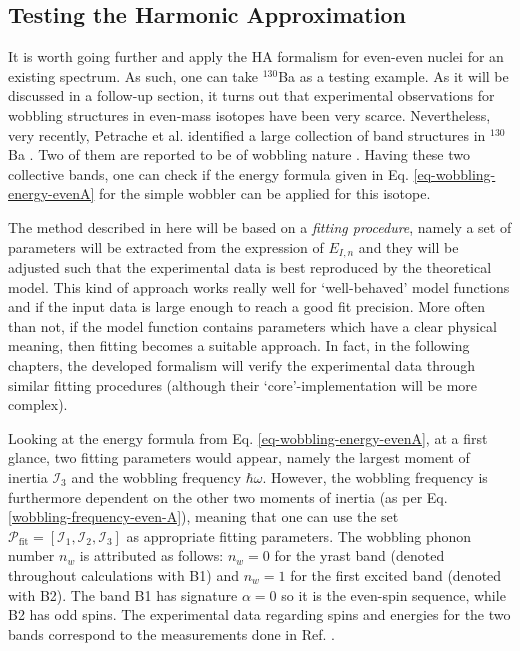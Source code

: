 \subsection{Testing the Harmonic Approximation}

It is worth going further and apply the HA formalism for even-even nuclei for an existing spectrum. As such, one can take $^{130}$Ba as a testing example. As it will be discussed in a follow-up section, it turns out that experimental observations for wobbling structures in even-mass isotopes have been very scarce. Nevertheless, very recently, Petrache et al. identified a large collection of band structures in $^{130}$Ba \cite{petrache2019diversity}. Two of them are reported to be of wobbling nature \cite{chen2019transverse}. Having these two collective bands, one can check if the energy formula given in Eq. \ref{eq-wobbling-energy-evenA} for the simple wobbler can be applied for this isotope.

The method described in here will be based on a \emph{fitting procedure}, namely a set of parameters will be extracted from the expression of $E_{I,n}$ and they will be adjusted such that the experimental data is best reproduced by the theoretical model. This kind of approach works really well for `well-behaved' model functions and if the input data is large enough to reach a good fit precision. More often than not, if the model function contains parameters which have a clear physical meaning, then fitting becomes a suitable approach. In fact, in the following chapters, the developed formalism will verify the experimental data through similar fitting procedures (although their `core'-implementation will be more complex).

Looking at the energy formula from Eq. \ref{eq-wobbling-energy-evenA}, at a first glance, two fitting parameters would appear, namely the largest moment of inertia $\mathcal{I}_3$ and the wobbling frequency $\hbar\omega$. However, the wobbling frequency is furthermore dependent on the other two moments of inertia (as per Eq. \ref{wobbling-frequency-even-A}), meaning that one can use the set $\mathcal{P}_\text{fit}=\left[\mathcal{I}_1,\mathcal{I}_2,\mathcal{I}_3\right]$ as appropriate fitting parameters. The wobbling phonon number $n_w$ is attributed as follows: $n_w=0$ for the yrast band (denoted throughout calculations with B1) and $n_w=1$ for the first excited band (denoted with B2). The band B1 has signature $\alpha=0$ so it is the even-spin sequence, while B2 has odd spins. The experimental data regarding spins and energies for the two bands correspond to the measurements done in Ref. \cite{petrache2019diversity}.

